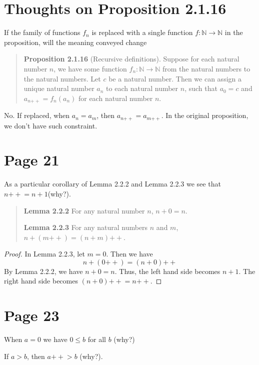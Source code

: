 \documentclass{article}
\newcommand{\doubleplus}{\mathbin{{+}{+}}}
\begin{document}
\section{Thoughts on Proposition 2.1.16}
If the family of functions $f_n$ is replaced with a single function
$f:\mathbb{N}\to\mathbb{N}$ in the proposition, will the meaning conveyed change
\begin{quotation}
    \textbf{Proposition 2.1.16} (Recursive definitions). Suppose for each natural
    number $n$, we have some function $f_n : \mathbb{N} \to \mathbb{N}$ from the
    natural numbers to the natural numbers. Let $c$ be a natural number. Then we
    can assign a unique natural number $a_n$ to each natural number $n$, such that
    $a_0 = c$ and $a_{n\doubleplus} = f_n(a_n)$ for each natural number $n$.
\end{quotation}

No. If replaced, when $a_n=a_m$, then $a_{n\doubleplus}=a_{m\doubleplus}$.
In the original proposition, we don't have such constraint.

\section{Page 21}
As a particular corollary of Lemma 2.2.2 and Lemma 2.2.3 we see that $n\doubleplus =n +1$(why?).

\begin{quotation}

    \textbf{Lemma 2.2.2} For any natural number $n$, $n +0 = n$.

    \textbf{Lemma 2.2.3} For any natural numbers $n$ and $m$, $n +(m\doubleplus) = (n +m)\doubleplus$.

\end{quotation}

\begin{proof}
    In Lemma 2.2.3, let $m = 0$.
    Then we have
    \[n + (0\doubleplus) = (n + 0) \doubleplus\]
    By Lemma 2.2.2, we have $n + 0 = n$.
    Thus, the left hand side becomes $n + 1$.
    The right hand side becomes $(n + 0) \doubleplus = n \doubleplus$.
\end{proof}

\section{Page 23}
When $a = 0$ we have $0\le b$ for all $b$ (why?)

If $a > b$, then $a\doubleplus  > b$ (why?).
\end{document}
